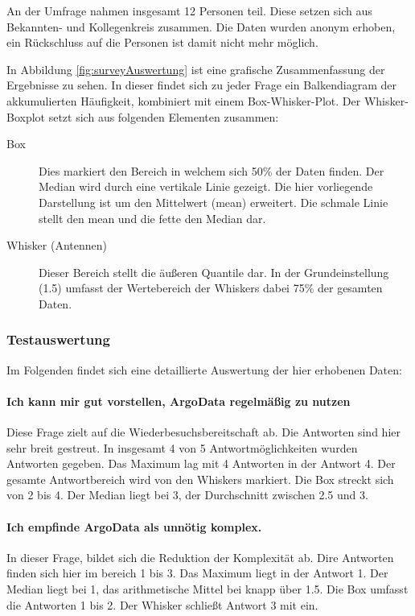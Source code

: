 An der Umfrage nahmen insgesamt 12 Personen teil. Diese setzen sich aus Bekannten- und Kollegenkreis zusammen. Die Daten wurden anonym erhoben, ein Rückschluss auf die Personen ist damit nicht mehr möglich.

In Abbildung \ref{fig:surveyAuswertung}
ist eine grafische Zusammenfassung der Ergebnisse zu sehen. In dieser findet sich zu jeder Frage ein Balkendiagram der akkumulierten Häufigkeit, kombiniert mit einem Box-Whisker-Plot. Der Whisker-Boxplot setzt sich aus folgenden Elementen zusammen:

\begin{description}
 \item [Box]
    Dies markiert den Bereich in welchem sich 50\% der Daten finden. Der Median wird durch eine vertikale Linie gezeigt. Die hier vorliegende Darstellung ist um den Mittelwert (mean) erweitert. Die schmale Linie stellt den mean und die fette den Median dar.
 \item [Whisker (Antennen)]
    Dieser Bereich stellt die äußeren Quantile dar. In der Grundeinstellung (1.5) umfasst der Wertebereich der Whiskers dabei 75\% der gesamten Daten. 
\end{description}


\subsubsection{Testauswertung}

Im Folgenden findet sich eine detaillierte Auswertung der hier erhobenen Daten:


\paragraph{Ich kann mir gut vorstellen, ArgoData regelmäßig zu nutzen}
    Diese Frage zielt auf die Wiederbesuchsbereitschaft ab. Die Antworten sind hier sehr breit gestreut. In insgesamt 4 von 5 Antwortmöglichkeiten wurden Antworten gegeben. Das Maximum lag mit 4 Antworten in der Antwort 4. Der gesamte Antwortbereich wird von den Whiskers markiert. Die Box streckt sich von 2 bis 4. Der Median liegt bei 3, der Durchschnitt zwischen 2.5 und 3.
 
 \paragraph{Ich empfinde ArgoData als unnötig komplex.}
    In dieser Frage, bildet sich die Reduktion der Komplexität ab. Dire Antworten finden sich hier im bereich 1 bis 3. Das Maximum liegt in der Antwort 1. Der Median liegt bei 1, das arithmetische Mittel bei knapp über 1.5. Die Box umfasst die Antworten 1 bis 2. Der Whisker schließt Antwort 3 mit ein.
    
